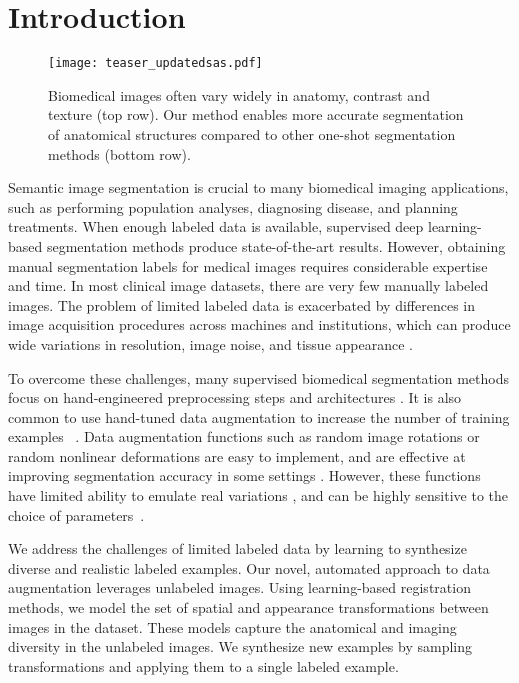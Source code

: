 \documentclass[10pt,twocolumn,letterpaper]{article}
\begin{document}
\section{Introduction}

\begin{figure}[t!]
\centering
\texttt{[image: teaser\_updatedsas.pdf]}
\vspace{-16pt}\caption{Biomedical images often vary widely in anatomy, contrast and  texture (top row). Our method enables more accurate segmentation of anatomical structures compared to other one-shot segmentation methods (bottom row).}
\label{fig:teaser}
\end{figure}

Semantic image segmentation is crucial to many biomedical imaging applications, such as performing population analyses, diagnosing disease, and planning treatments. When enough labeled data is available, supervised deep learning-based segmentation methods produce state-of-the-art results. However, obtaining manual segmentation labels for medical images requires considerable expertise and time. In most clinical image datasets, there are very few manually labeled images. The problem of limited labeled data is exacerbated by differences in image acquisition procedures across machines and institutions, which can produce wide variations in resolution, image noise, and tissue appearance \cite{leung2010robust}. 

To overcome these challenges, many supervised biomedical segmentation methods focus on hand-engineered preprocessing steps and architectures \cite{moeskops2016automatic,pereira2016brain}. It is also common to use hand-tuned data augmentation to increase the number of training examples ~\cite{akkus2017deep,oliveira2017augmenting,pereira2016brain,ronneberger2015u,roth2015deeporgan}. Data augmentation functions such as random image rotations or random nonlinear deformations are easy to implement, and are effective at improving segmentation accuracy in some settings \cite{oliveira2017augmenting,pereira2016brain,ronneberger2015u,roth2015deeporgan}. However, these functions have limited ability to emulate real variations \cite{eaton2018improving}, and can be highly sensitive to the choice of parameters~\cite{dosovitskiy2016discriminative}.

We address the challenges of limited labeled data by learning to synthesize diverse and realistic labeled examples. Our novel, automated approach to data augmentation leverages unlabeled images. Using learning-based registration methods, we model the set of spatial and appearance transformations between images in the dataset. These models capture the anatomical and imaging diversity in the unlabeled images. We synthesize new examples by sampling transformations and applying them to a single labeled example. 
\end{document}
